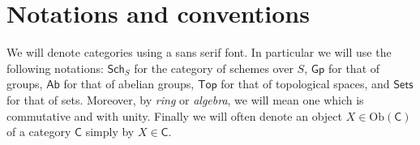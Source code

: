 \section*{Notations and conventions}
We will denote categories using a sans serif font.
In particular we will use the following notations:
$\mathsf{Sch}_{S}$ for the category of schemes over $S$,
$\mathsf{Gp}$ for that of groups,
$\mathsf{Ab}$ for that of abelian groups,
$\mathsf{Top}$ for that of topological spaces,
and $\mathsf{Sets}$ for that of sets.
Moreover, by {\em ring} or {\em algebra}, we will mean one which is commutative and with unity.
Finally we will often denote an object $X \in \mathrm{Ob} \left(\mathsf{C}\right)$ 
of a category $\mathsf{C}$ simply by $X \in \mathsf{C}$.

